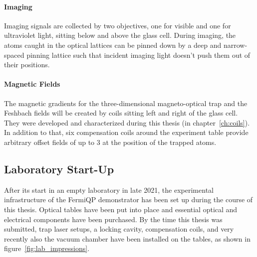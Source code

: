 \paragraph{Imaging}
Imaging signals are collected by two objectives, one for visible and one for ultraviolet light, sitting below and above the glass cell. During imaging, the atoms caught in the optical lattices can be pinned down by a deep and narrow-spaced pinning lattice such that incident imaging light doesn't push them out of their positions.

\paragraph{Magnetic Fields}
The magnetic gradients for the three-dimensional magneto-optical trap and the Fesh\-bach fields will be created by coils sitting left and right of the glass cell. They were developed and characterized during this thesis (in chapter~\ref{ch:coils}). In addition to that, six compensation coils around the experiment table provide arbitrary offset fields of up to \SI[]{3}{\gauss} at the position of the trapped atoms.

\subsection*{Laboratory Start-Up}
After its start in an empty laboratory in late 2021, the experimental infrastructure of the FermiQP demonstrator has been set up during the course of this thesis. Optical tables have been put into place and essential optical and electrical components have been purchased. By the time this thesis was submitted, trap laser setups, a locking cavity, compensation coils, and very recently also the vacuum chamber have been installed on the tables, as shown in figure~\ref{fig:lab_impressions}.

